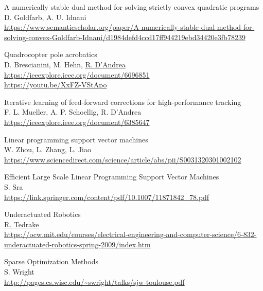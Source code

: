 \documentclass{article}
\begin{document}
\begin{thebibliography}{1}
        A numerically stable dual method for solving strictly convex quadratic programs
        \\
        D. Goldfarb, A. U. Idnani
        \\
        \url{ https://www.semanticscholar.org/paper/A-numerically-stable-dual-method-for-solving-convex-Goldfarb-Idnani/d1984defd4ccd17ff944219ebd34420e3fb78239 }

        Quadrocopter pole acrobatics
        \\
        D. Brescianini, M. Hehn, \href{https://raffaello.name/biography/}{R. D'Andrea}
        \\
        \url{ https://ieeexplore.ieee.org/document/6696851 }   
        \\
        \url{ https://youtu.be/XxFZ-VStApo }

        Iterative learning of feed-forward corrections for high-performance tracking
        \\
        F. L. Mueller, A. P. Schoellig, R. D'Andrea
        \\
        \url{ https://ieeexplore.ieee.org/document/6385647 }

        Linear programming support vector machines
        \\
        W. Zhou, L. Zhang, L. Jiao
        \\
        \url{ https://www.sciencedirect.com/science/article/abs/pii/S0031320301002102 }

        Efficient Large Scale Linear Programming Support Vector Machines
        \\
        S. Sra
        \\
        \url{ https://link.springer.com/content/pdf/10.1007/11871842_78.pdf }

        Underactuated Robotics
        \\
        \href{https://groups.csail.mit.edu/locomotion/russt.html}{R. Tedrake}
        \\
        \url{ https://ocw.mit.edu/courses/electrical-engineering-and-computer-science/6-832-underactuated-robotics-spring-2009/index.htm }
            
        Sparse Optimization Methods
        \\
        S. Wright
        \\
        \url{ http://pages.cs.wisc.edu/~swright/talks/sjw-toulouse.pdf }


\end{thebibliography}
\end{document}
